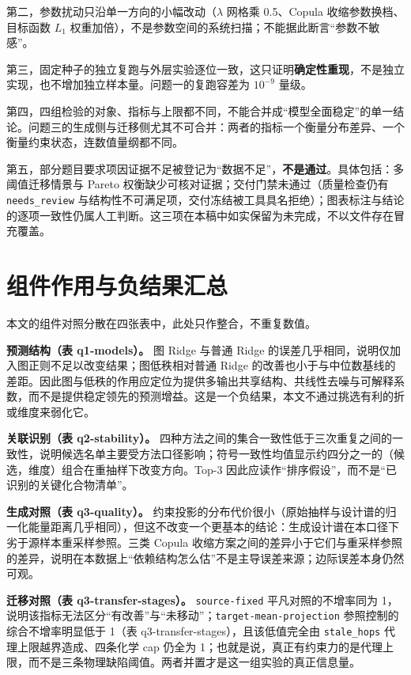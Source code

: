 \documentclass[11pt,a4paper]{article}
\begin{document}
第二，参数扰动只沿单一方向的小幅改动（\(\lambda\) 网格乘 0.5、Copula
收缩参数换档、目标函数 \(L_1\)
权重加倍），不是参数空间的系统扫描；不能据此断言``参数不敏感''。

第三，固定种子的独立复跑与外层实验逐位一致，这只证明\textbf{确定性重现}，不是独立实现，也不增加独立样本量。问题一的复跑容差为
\(10^{-9}\) 量级。

第四，四组检验的对象、指标与上限都不同，不能合并成``模型全面稳定''的单一结论。问题三的生成侧与迁移侧尤其不可合并：两者的指标一个衡量分布差异、一个衡量约束状态，连数值量纲都不同。

第五，部分题目要求项因证据不足被登记为``数据不足''，\textbf{不是通过}。具体包括：多阈值迁移情景与
Pareto 权衡缺少可核对证据；交付门禁未通过（质量检查仍有
\texttt{needs\_review}
与结构性不可满足项，交付冻结被工具具名拒绝）；图表标注与结论的逐项一致性仍属人工判断。这三项在本稿中如实保留为未完成，不以文件存在冒充覆盖。

\section{组件作用与负结果汇总}\label{ux7ec4ux4ef6ux4f5cux7528ux4e0eux8d1fux7ed3ux679cux6c47ux603b}

本文的组件对照分散在四张表中，此处只作整合，不重复数值。

\textbf{预测结构（表 q1-models）。} 图 Ridge 与普通 Ridge
的误差几乎相同，说明仅加入图正则不足以改变结果；图低秩相对普通 Ridge
的改善也小于与中位数基线的差距。因此图与低秩的作用应定位为提供多输出共享结构、共线性去噪与可解释系数，而不是提供稳定领先的预测增益。这是一个负结果，本文不通过挑选有利的折或维度来弱化它。

\textbf{关联识别（表 q2-stability）。}
四种方法之间的集合一致性低于三次重复之间的一致性，说明候选名单主要受方法口径影响；符号一致性均值显示约四分之一的（候选，维度）组合在重抽样下改变方向。Top-3
因此应读作``排序假设''，而不是``已识别的关键化合物清单''。

\textbf{生成对照（表 q3-quality）。}
约束投影的分布代价很小（原始抽样与设计谱的归一化能量距离几乎相同），但这不改变一个更基本的结论：生成设计谱在本口径下劣于源样本重采样参照。三类
Copula
收缩方案之间的差异小于它们与重采样参照的差异，说明在本数据上``依赖结构怎么估''不是主导误差来源；边际误差本身仍然可观。

\textbf{迁移对照（表 q3-transfer-stages）。} \texttt{source-fixed}
平凡对照的不增率同为
1，说明该指标无法区分``有改善''与``未移动''；\texttt{target-\allowbreak{}mean-\allowbreak{}projection}
参照控制的综合不增率明显低于 1（表 q3-transfer-stages），且该低值完全由
\texttt{stale\_hops} 代理上限越界造成、四条化学 cap 仍全为
1；也就是说，真正有约束力的是代理上限，而不是三条物理缺陷阈值。两者并置才是这一组实验的真正信息量。
\end{document}
